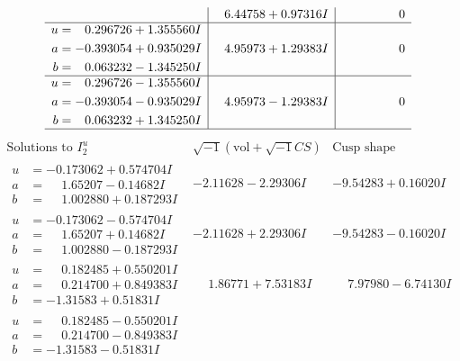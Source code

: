 \documentclass[1p]{elsarticle_modified}
\theoremstyle{definition}
\newcommand{\I}{\sqrt{-1}}
\begin{document}
$$\begin{array}{c|c|c}
 & \phantom{-}6.44758 + 0.97316 I & \phantom{-0.000000 } 0 \\ \hline\begin{aligned}
u &= \phantom{-}0.296726 + 1.355560 I \\
a &= -0.393054 + 0.935029 I \\
b &= \phantom{-}0.063232 - 1.345250 I\end{aligned}
 & \phantom{-}4.95973 + 1.29383 I & \phantom{-0.000000 } 0 \\ \hline\begin{aligned}
u &= \phantom{-}0.296726 - 1.355560 I \\
a &= -0.393054 - 0.935029 I \\
b &= \phantom{-}0.063232 + 1.345250 I\end{aligned}
 & \phantom{-}4.95973 - 1.29383 I & \phantom{-0.000000 } 0\\
 \hline 
 \end{array}$$\newpage$$\begin{array}{c|c|c}  
\text{Solutions to }I^u_{2}& \I (\text{vol} + \sqrt{-1}CS) & \text{Cusp shape}\\
 \hline 
\begin{aligned}
u &= -0.173062 + 0.574704 I \\
a &= \phantom{-}1.65207 - 0.14682 I \\
b &= \phantom{-}1.002880 + 0.187293 I\end{aligned}
 & -2.11628 - 2.29306 I & -9.54283 + 0.16020 I \\ \hline\begin{aligned}
u &= -0.173062 - 0.574704 I \\
a &= \phantom{-}1.65207 + 0.14682 I \\
b &= \phantom{-}1.002880 - 0.187293 I\end{aligned}
 & -2.11628 + 2.29306 I & -9.54283 - 0.16020 I \\ \hline\begin{aligned}
u &= \phantom{-}0.182485 + 0.550201 I \\
a &= \phantom{-}0.214700 + 0.849383 I \\
b &= -1.31583 + 0.51831 I\end{aligned}
 & \phantom{-}1.86771 + 7.53183 I & \phantom{-}7.97980 - 6.74130 I \\ \hline\begin{aligned}
u &= \phantom{-}0.182485 - 0.550201 I \\
a &= \phantom{-}0.214700 - 0.849383 I \\
b &= -1.31583 - 0.51831 I\end{aligned}

\end{array}$$
\end{document}
